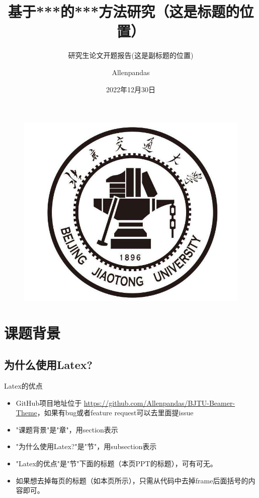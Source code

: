 \documentclass{beamer}
\author{Allenpandas}
\title{基于***的***方法研究（这是标题的位置）}
\subtitle{研究生论文开题报告(这是副标题的位置)}
\institute{北京交通大学·计算机与信息技术学院}
\date{2022年12月30日}
\begin{document}
\kaishu
\begin{frame}
    \titlepage
    \begin{figure}[htpb]
        \begin{center}
            \includegraphics[width=0.2\linewidth]{pic/bjtu_logo.jpeg}
        \end{center}
    \end{figure}
\end{frame}


\begin{frame}
    \tableofcontents[sectionstyle=show,subsectionstyle=show/shaded/hide,subsubsectionstyle=show/shaded/hide]
\end{frame}


\section{课题背景}
\subsection{为什么使用Latex?}
\begin{frame}{Latex的优点}
    \begin{itemize}
        \item GitHub项目地址位于 \url{https://github.com/Allenpandas/BJTU-Beamer-Theme}，如果有bug或者feature request可以去里面提issue
        \item "课题背景"是"章"，用section表示
        \item "为什么使用Latex?"是"节"，用subsection表示
        \item "Latex的优点"是"节"下面的标题（本页PPT的标题），可有可无。
    \end{itemize}
\end{frame}

\begin{frame}{}
    \begin{itemize}
        \item 如果想去掉每页的标题（如本页所示），只需从代码中去掉{frame}后面括号的内容即可。
    \end{itemize}
\end{frame}
\end{document}
